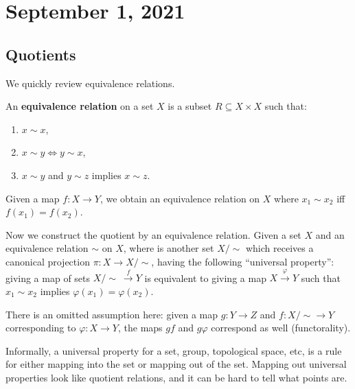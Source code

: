 \section{September 1, 2021} 
\subsection{Quotients}
We quickly review equivalence relations.
\begin{definition}[]
    An \textbf{equivalence relation} on a set $X$ is a subset $R \subseteq X \times X$ such that:
    \begin{enumerate}[label=(\arabic*)]
    \setlength\itemsep{-.2em}
        \item $x\sim x$,
        \item $x\sim y \iff y \sim x$,
        \item $x\sim y$ and $y\sim z$ implies $x\sim z$.
    \end{enumerate}
\end{definition}
\begin{example}
    Given a map $f \colon X \to Y$, we obtain an equivalence relation on $X$ where $x_1\sim x_2$ iff $f(x_1)=f(x_2)$.
\end{example}
Now we construct the quotient by an equivalence relation. Given a set $X$ and an equivalence relation $\sim$ on $X$, where is another set $X / \sim$ which receives a canonical projection $\pi \colon X \to X / \sim$, having the following ``universal property'': giving a map of sets $X / \sim \ \xrightarrow{f} Y$ is equivalent to giving a map $X \xrightarrow{\varphi } Y$ such that $x_1\sim x_2$ implies $\varphi (x_1)=\varphi (x_2)$.

    There is an omitted assumption here: given a map $g \colon Y \to Z$ and $f \colon X / \sim \to Y$ corresponding to $\varphi  \colon X \to Y$, the maps $gf$ and $g \varphi $ correspond as well (functorality).
\begin{remark}
    Informally, a universal property for a set, group, topological space, etc, is a rule for either mapping into the set or mapping out of the set. Mapping out universal properties look like quotient relations, and it can be hard to tell what points are.

\end{remark}

